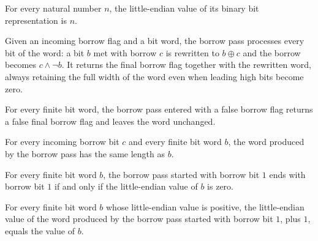 \begin{lemma}
\label{Complexity.budgetValue_bits}
\leanok
{}
For every natural number $n$, the little-endian value of its binary bit representation
is $n$.
\end{lemma}

\begin{definition}
\label{Complexity.budgetBorrow}
\leanok
Given an incoming borrow flag and a bit word, the borrow pass processes every bit of
the word: a bit $b$ met with borrow $c$ is rewritten to $b \oplus c$ and the borrow
becomes $c \wedge \lnot b$.  It returns the final borrow flag together with the
rewritten word, always retaining the full width of the word even when leading high
bits become zero.
\end{definition}

\begin{lemma}
\label{Complexity.budgetBorrow_false}
\leanok
{}
For every finite bit word, the borrow pass entered with a false borrow flag returns a
false final borrow flag and leaves the word unchanged.
\end{lemma}

\begin{lemma}
\label{Complexity.budgetBorrow_length}
\leanok
{}
For every incoming borrow bit $c$ and every finite bit word $b$, the word produced by
the borrow pass has the same length as $b$.
\end{lemma}

\begin{lemma}
\label{Complexity.budgetBorrow_underflow}
\leanok
{}
For every finite bit word $b$, the borrow pass started with borrow bit $1$ ends with
borrow bit $1$ if and only if the little-endian value of $b$ is zero.
\end{lemma}

\begin{lemma}
\label{Complexity.budgetBorrow_value}
\leanok
{}
For every finite bit word $b$ whose little-endian value is positive, the little-endian
value of the word produced by the borrow pass started with borrow bit $1$, plus $1$,
equals the value of $b$.
\end{lemma}

